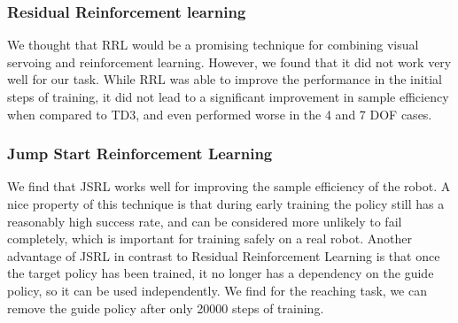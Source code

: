 \documentclass[letterpaper, 10 pt, conference]{ieeeconf}  %
\begin{document}
\subsubsection{Residual Reinforcement learning}

We thought that RRL would be a promising technique for combining visual servoing
and reinforcement learning. However, we found that it did not work very well for
our task. While RRL was able to improve the performance in the initial steps
of training, it did not lead to a significant improvement in sample efficiency
when compared to TD3, and even performed worse in the 4 and 7 DOF cases.

\subsubsection{Jump Start Reinforcement Learning}

We find that JSRL works well for improving the sample efficiency of the robot. A
nice property of this technique is that during early training the policy still
has a reasonably high success rate, and can be considered more unlikely to fail
completely, which is important for training safely on a real robot. Another
advantage of JSRL in contrast to Residual Reinforcement Learning is that once
the target policy has been trained, it no longer has a dependency on the guide
policy, so it can be used independently. We find for the reaching task,
we can remove the guide policy after only 20000 steps of training.
\end{document}
